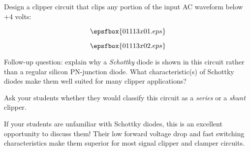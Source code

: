 

Design a clipper circuit that clips any portion of the input AC waveform below +4 volts:

$$\epsfbox{01113x01.eps}$$







$$\epsfbox{01113x02.eps}$$

\vskip 10pt

Follow-up question: explain why a {\it Schottky} diode is shown in this circuit rather than a regular silicon PN-junction diode.  What characteristic(s) of Schottky diodes make them well suited for many clipper applications?







Ask your students whether they would classify this circuit as a {\it series} or a {\it shunt} clipper.

\vskip 10pt

If your students are unfamiliar with Schottky diodes, this is an excellent opportunity to discuss them!  Their low forward voltage drop and fast switching characteristics make them superior for most signal clipper and clamper circuits.




